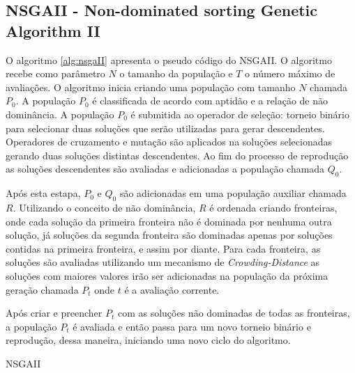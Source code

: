 \subsection{NSGAII - Non-dominated sorting Genetic Algorithm II}

O algoritmo \ref{alg:nsgaII} apresenta o pseudo código do NSGAII. O algoritmo recebe como parâmetro $N$ o tamanho da população e $T$ o número máximo 
de avaliações. O algoritmo inicia criando uma população com tamanho $N$ chamada $P_0$. A população $P_0$ é classificada de acordo com aptidão 
e a relação de não dominância. A população $P_0$ é submitida ao operador de seleção: torneio binário para selecionar duas soluções que serão utilizadas
para gerar descendentes. Operadores de cruzamento e mutação são aplicados na soluções selecionadas gerando duas soluções distintas descendentes. 
Ao fim do processo de reprodução as soluções descendentes são avaliadas e adicionadas a população chamada $Q_0$.

Após esta estapa, $P_0$ e $Q_0$ são adicionadas em uma população auxiliar chamada $R$. Utilizando o conceito de não dominância, $R$ é ordenada 
criando fronteiras, onde cada solução da primeira fronteira não é dominada por nenhuma outra solução, já soluções da segunda fronteira são dominadas
apenas por soluções contidas na primeira fronteira, e assim por diante. Para cada fronteira, as soluções são avaliadas utilizando um mecanismo
de \textit{Crowding-Distance} as soluções com maiores valores irão ser adicionadas na população da próxima geração chamada $P_t$ onde $t$ é a
avaliação corrente.

Após criar e preencher $P_t$ com as soluções não dominadas de todas as fronteiras, a população $P_t$ é avaliada e então passa para um novo
torneio binário e reprodução, dessa maneira, iniciando uma novo ciclo do algoritmo.

\begin{algorithm}[htb!]
	\begin{algorithmic}[1]
		\EndWhile
		\EndWhile
		
		\EndWhile
	\end{algorithmic}
	\caption{NSGAII}
	\label{alg:nsgaII}
\end{algorithm}


